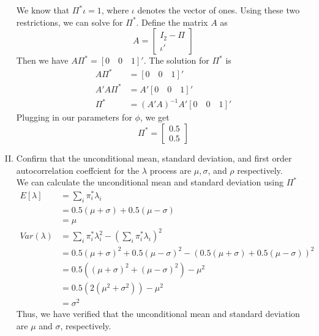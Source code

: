 \documentclass[french]{article}
\begin{document}
\begin{enumerate}[I.]
	We know that $\Pi^*\iota = 1$, where $\iota$ denotes the vector of ones. Using these two restrictions, we can solve for $\Pi^*$. Define the matrix $A$ as 
	\begin{equation*}
		A = \begin{bmatrix}
		I_2 - \Pi \\ \iota'
		\end{bmatrix}
	\end{equation*}
	Then we have $A\Pi^* = \left[0\quad0\quad 1\right]'$. The solution for $\Pi^*$ is 
	\begin{equation*}
	\begin{split}
	A\Pi^* &= \left[0\quad0\quad 1\right]'\\
	A'A\Pi^* &= A'\left[0\quad0\quad 1\right]'\\
	\Pi^* &= (A'A)^{-1}A'\left[0 \quad 0 \quad 1\right]'
	\end{split}
	\end{equation*}
	Plugging in our parameters for $\phi$, we get 
	\begin{equation*}
		\Pi^* =	
		\begin{bmatrix}
		0.5\\ 0.5
		\end{bmatrix}
	\end{equation*}
	\item Confirm that the unconditional mean, standard deviation, and first order autocorrelation coeffcient for the $\lambda$ process are $\mu, \sigma$, and $\rho$ respectively. \\
	
	We can calculate the unconditional mean and standard deviation using $\Pi^*$
	\begin{equation*}
		\begin{split}
		E\left[\lambda\right] &= \sum_i \pi_{i}^*\lambda_i\\
		&= 0.5 (\mu+\sigma) + 0.5(\mu -\sigma)\\
		&= \mu\\
		Var(\lambda)&= \sum_i \pi_{i}^* \lambda_i^2 - \left(\sum_i \pi_{i}^*\lambda_i\right)^2\\
		&=0.5 (\mu+\sigma)^2 + 0.5(\mu -\sigma)^2 - (0.5 (\mu+\sigma) + 0.5(\mu -\sigma))^2\\
		&= 0.5( (\mu+\sigma)^2 +(\mu -\sigma)^2) - \mu^2\\
		&=  0.5( 2(\mu^2+\sigma^2)) - \mu^2\\
		& = \sigma^2
		\end{split}
	\end{equation*}
	Thus, we have verified that the unconditional mean and standard deviation are $\mu$ and $\sigma$, respectively. 
\end{enumerate}
\end{document}

